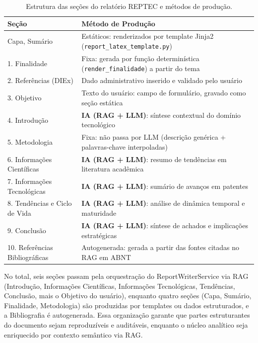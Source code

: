 \documentclass[12pt, a4paper]{article}
\begin{document}
\begin{table}[H]
\centering
\small
\caption{Estrutura das seções do relatório REPTEC e métodos de produção.}
\label{tab:secoes-relatorio}
\begin{tabular}{|p{4cm}|p{8cm}|}
\hline
\textbf{Seção} & \textbf{Método de Produção} \\
\hline
Capa, Sumário & Estáticos: renderizados por template Jinja2 (\texttt{report\_latex\_template.py}) \\
\hline
1. Finalidade & Fixa: gerada por função determinística (\texttt{render\_finalidade}) a partir do tema \\
\hline
2. Referências (DIEx) & Dado administrativo inserido e validado pelo usuário \\
\hline
3. Objetivo & Texto do usuário: campo de formulário, gravado como seção estática \\
\hline
4. Introdução & \textbf{IA (RAG + LLM)}: síntese contextual do domínio tecnológico \\
\hline
5. Metodologia & Fixa: não passa por LLM (descrição genérica + palavras-chave interpoladas) \\
\hline
6. Informações Científicas & \textbf{IA (RAG + LLM)}: resumo de tendências em literatura acadêmica \\
\hline
7. Informações Tecnológicas & \textbf{IA (RAG + LLM)}: sumário de avanços em patentes \\
\hline
8. Tendências e Ciclo de Vida & \textbf{IA (RAG + LLM)}: análise de dinâmica temporal e maturidade \\
\hline
9. Conclusão & \textbf{IA (RAG + LLM)}: síntese de achados e implicações estratégicas \\
\hline
10. Referências Bibliográficas & Autogenerada: gerada a partir das fontes citadas no RAG em ABNT \\
\hline
\end{tabular}
\end{table}

  No total, seis seções passam pela orquestração do ReportWriterService via RAG (Introdução, Informações Científicas, Informações Tecnológicas, Tendências, Conclusão, mais o Objetivo do usuário), enquanto quatro seções (Capa, Sumário, Finalidade, Metodologia) são produzidas por templates ou dados estruturados, e a Bibliografia é autogenerada. Essa organização garante que partes estruturantes do documento sejam reproduzíveis e auditáveis, enquanto o núcleo analítico seja enriquecido por contexto semântico via RAG.
\end{document}
